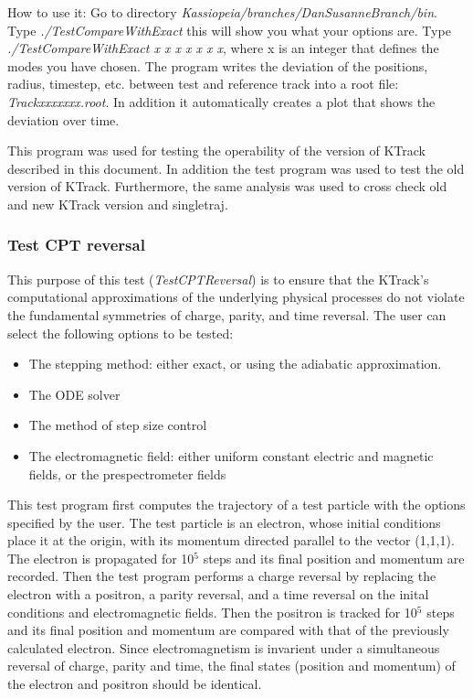     How to use it: Go to directory \textit{Kassiopeia/branches/DanSusanneBranch/bin}. Type \textit{./TestCompareWithExact} this will show you what your options are. Type \textit{./TestCompareWithExact x x x x x x x}, where x is an integer that defines the modes you have chosen. The program writes the deviation of the positions, radius, timestep, etc. between test and reference track into a root file: \textit{Trackxxxxxxx.root}. In addition it automatically creates a plot that shows the deviation over time.
    
    This program was used for testing the operability of the version of KTrack described in this document. In addition the test program was used to test the old version of KTrack. Furthermore, the same analysis was used to cross check old and new KTrack version and singletraj.

    
    \subsubsection*{Test CPT reversal}
    \label{testtime}
     This purpose of this test (\textit{TestCPTReversal}) is to ensure that the KTrack's computational approximations of the underlying
     physical processes do not violate the fundamental symmetries of charge, parity, and time reversal. 
     The user can select the following options to be tested:
    \begin{itemize}
     \item The stepping method: either exact, or using the adiabatic approximation.
     \item The ODE solver
     \item The method of step size control
     \item The electromagnetic field: either uniform constant electric and magnetic fields, or the prespectrometer fields      
    \end{itemize}
    This test program first computes the trajectory of a test particle with the options specified by the user. The
    test particle is an electron, whose initial conditions place it at the origin, with its momentum directed parallel
    to the vector (1,1,1). The electron is propagated for 10$^{5}$ steps and its final position and momentum are recorded.
    Then the test program performs a charge reversal by replacing the electron with a positron, a parity reversal, and a 
    time reversal on the inital conditions and electromagnetic fields. Then the positron is tracked for 10$^{5}$ steps and
    its final position and momentum are compared with that of the previously calculated electron. Since electromagnetism is
    invarient under a simultaneous reversal of charge, parity and time, the final states (position and momentum) of the electron
    and positron should be identical.

